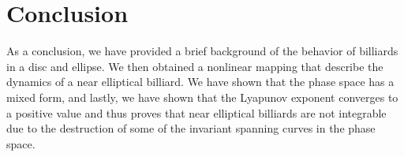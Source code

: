 \chapter{Conclusion}
As a conclusion, we have provided a brief background of the behavior of billiards in a disc and ellipse. We then obtained a nonlinear mapping that describe the dynamics of a near elliptical billiard. We have shown that the phase space has a mixed form, and lastly, we have shown that the Lyapunov exponent converges to a positive value and thus proves that near elliptical billiards are not integrable due to the destruction of some of the invariant spanning curves in the phase space. 